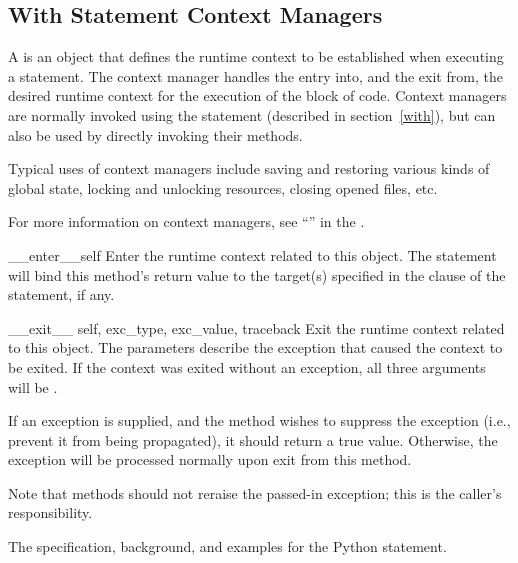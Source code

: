 \subsection{With Statement Context Managers\label{context-managers}}


A  is an object that defines the runtime
context to be established when executing a 
statement. The context manager handles the entry into,
and the exit from, the desired runtime context for the execution
of the block of code.  Context managers are normally invoked using
the  statement (described in section~\ref{with}), but
can also be used by directly invoking their methods.


Typical uses of context managers include saving and
restoring various kinds of global state, locking and unlocking
resources, closing opened files, etc.

For more information on context managers, see
``'' in the
.

\begin{methoddesc}{__enter__}{self}
Enter the runtime context related to this object. The 
statement will bind this method's return value to the target(s)
specified in the  clause of the statement, if any.
\end{methoddesc}

\begin{methoddesc}{__exit__}
{self, exc_type, exc_value, traceback}
Exit the runtime context related to this object. The parameters
describe the exception that caused the context to be exited. If
the context was exited without an exception, all three arguments
will be .

If an exception is supplied, and the method wishes to suppress the
exception (i.e., prevent it from being propagated), it should return a
true value. Otherwise, the exception will be processed normally upon
exit from this method.

Note that  methods should not reraise the passed-in
exception; this is the caller's responsibility.
\end{methoddesc}

\begin{seealso}
         {The specification, background, and examples for the
          Python  statement.}
\end{seealso}

